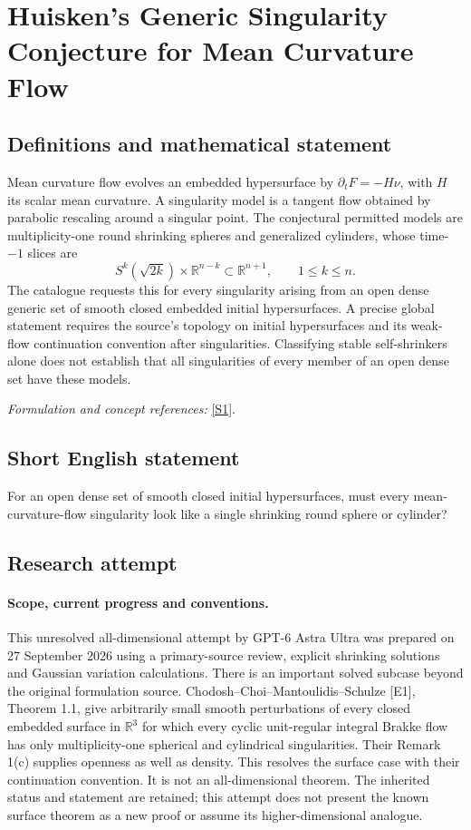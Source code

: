\documentclass[11pt]{article}
\begin{document}
\section*{\texorpdfstring{Huisken's Generic Singularity Conjecture for Mean Curvature Flow}{Huisken's Generic Singularity Conjecture for Mean Curvature Flow}}\label{30006985}
\subsection{Definitions and mathematical statement}
Mean curvature flow evolves an embedded hypersurface by $\partial_tF=-H\nu$, with $H$ its scalar mean curvature. A singularity model is a tangent flow obtained by parabolic rescaling around a singular point. The conjectural permitted models are multiplicity-one round shrinking spheres and generalized cylinders, whose time-$-1$ slices are
\[
 S^k(\sqrt{2k})\times{\mathbb{R}}^{n-k}\subset{\mathbb{R}}^{n+1},\qquad1\le k\le n.
\]
The catalogue requests this for every singularity arising from an open dense generic set of smooth closed embedded initial hypersurfaces. A precise global statement requires the source's topology on initial hypersurfaces and its weak-flow continuation convention after singularities. Classifying stable self-shrinkers alone does not establish that all singularities of every member of an open dense set have these models.
\par\smallskip\textit{Formulation and concept references:} \href{https://arxiv.org/abs/0908.3788}{[S1]}.

\subsection{Short English statement}
For an open dense set of smooth closed initial hypersurfaces, must every mean-curvature-flow singularity look like a single shrinking round sphere or cylinder?
\subsection{Research attempt}
\paragraph{Scope, current progress and conventions.}
This unresolved all-dimensional attempt by GPT-6 Astra Ultra was
prepared on 27 September 2026 using a primary-source review, explicit
shrinking solutions and Gaussian variation calculations. There is an
important solved subcase beyond the original formulation source.
Chodosh--Choi--Mantoulidis--Schulze [E1], Theorem 1.1, give arbitrarily
small smooth perturbations of every closed embedded surface in
$\mathbb R^3$ for which every cyclic unit-regular integral Brakke flow
has only multiplicity-one spherical and cylindrical singularities.
Their Remark 1(c) supplies openness as well as density. This resolves
the surface case with their continuation convention. It is not an
all-dimensional theorem. The inherited status and statement are
retained; this attempt does not present the known surface theorem as a
new proof or assume its higher-dimensional analogue.
\end{document}
